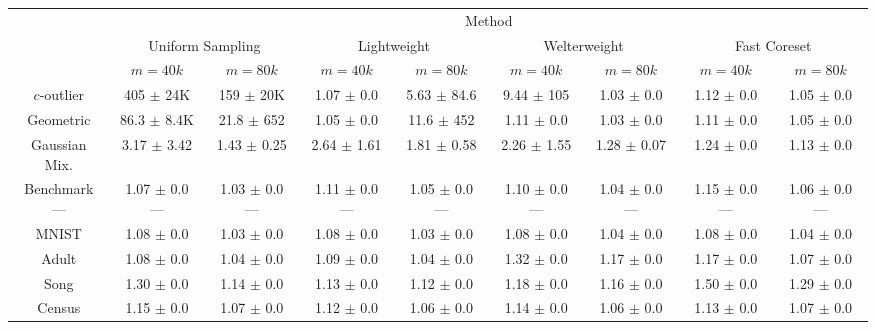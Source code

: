 \begin{table*}
    \centering
    \vspace*{-0.1cm}
    \tiny
    \begin{tabular}{|c|cc|cc|cc|cc|}
        \hline
        & \multicolumn{8}{c|}{Method} \\
        \cline{2-9} & \multicolumn{2}{c|}{Uniform Sampling} & \multicolumn{2}{c|}{Lightweight} & \multicolumn{2}{c|}{Welterweight} & \multicolumn{2}{c|}{Fast Coreset} \\
        & $m=40k$ & $m=80k$ & $m=40k$ & $m=80k$ & $m=40k$ & $m=80k$ & $m=40k$ & $m=80k$ \\
        \cline{2-9}
        $c$-outlier & 405 $\pm$ 24K & 159 $\pm$ 20K & 1.07 $\pm$ 0.0 & 5.63 $\pm$ 84.6 & 9.44 $\pm$ 105 & 1.03 $\pm$ 0.0 & 1.12 $\pm$ 0.0 & 1.05 $\pm$ 0.0 \\
        Geometric & 86.3 $\pm$ 8.4K & 21.8 $\pm$ 652 & 1.05 $\pm$ 0.0 & 11.6 $\pm$ 452 & 1.11 $\pm$ 0.0 & 1.03 $\pm$ 0.0 & 1.11 $\pm$ 0.0 & 1.05 $\pm$ 0.0 \\
        Gaussian Mix. & 3.17 $\pm$ 3.42 & 1.43 $\pm$ 0.25 & 2.64 $\pm$ 1.61 & 1.81 $\pm$ 0.58 & 2.26 $\pm$ 1.55 & 1.28 $\pm$ 0.07 & 1.24 $\pm$ 0.0 & 1.13 $\pm$
        0.0 \\
        \makecell{Benchmark\\---} & \makecell{1.07 $\pm$ 0.0\\---} & \makecell{1.03 $\pm$ 0.0\\---} & \makecell{1.11 $\pm$ 0.0\\---} & \makecell{1.05 $\pm$
        0.0\\---} & \makecell{1.10 $\pm$ 0.0\\---} & \makecell{1.04 $\pm$ 0.0\\---} & \makecell{1.15 $\pm$ 0.0\\---} & \makecell{1.06 $\pm$ 0.0\\---} \\
        MNIST & 1.08 $\pm$ 0.0 & 1.03 $\pm$ 0.0 & 1.08 $\pm$ 0.0 & 1.03 $\pm$ 0.0 & 1.08 $\pm$ 0.0 & 1.04 $\pm$ 0.0 & 1.08 $\pm$ 0.0 & 1.04 $\pm$ 0.0 \\
        Adult & 1.08 $\pm$ 0.0 & 1.04 $\pm$ 0.0 & 1.09 $\pm$ 0.0 & 1.04 $\pm$ 0.0 & 1.32 $\pm$ 0.0 & 1.17 $\pm$ 0.0 & 1.17 $\pm$ 0.0 & 1.07 $\pm$ 0.0 \\
        Song & 1.30 $\pm$ 0.0 & 1.14 $\pm$ 0.0 & 1.13 $\pm$ 0.0 & 1.12 $\pm$ 0.0 & 1.18 $\pm$ 0.0 & 1.16 $\pm$ 0.0 & 1.50 $\pm$ 0.0 & 1.29 $\pm$ 0.0 \\
        Census & 1.15 $\pm$ 0.0 & 1.07 $\pm$ 0.0 & 1.12 $\pm$ 0.0 & 1.06 $\pm$ 0.0 & 1.14 $\pm$ 0.0 & 1.06 $\pm$ 0.0 & 1.13 $\pm$ 0.0 & 1.07 $\pm$ 0.0 \\

\end{tabular}
\end{table*}
